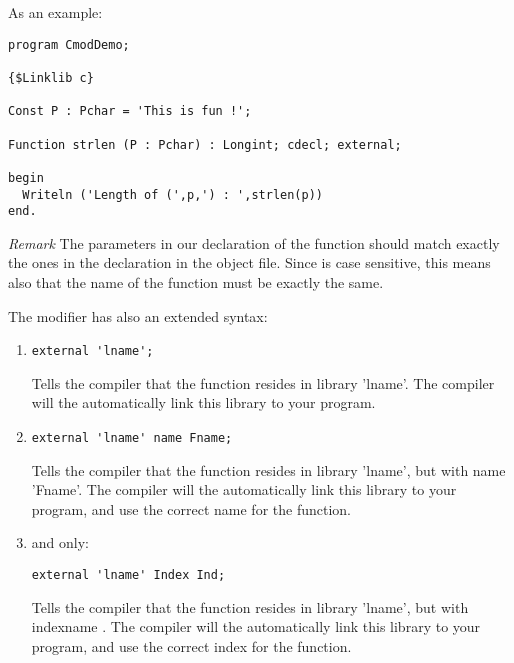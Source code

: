 \documentclass{report}
\begin{document}
As an example:
\begin{CodEx}
\begin{verbatim}
program CmodDemo;

{$Linklib c}

Const P : Pchar = 'This is fun !';

Function strlen (P : Pchar) : Longint; cdecl; external;

begin
  Writeln ('Length of (',p,') : ',strlen(p))
end.
\end{verbatim}
\end{CodEx}

{\em Remark} The parameters in our declaration of the  function 
should match exactly the ones in the declaration in the object file.
Since  is case sensitive, this means also that the name of the
function must be exactly the same.

The  modifier has also an extended syntax:
\begin{enumerate}
\item

\begin{verbatim}
external 'lname';
\end{verbatim}
Tells the compiler that the function resides in library 'lname'. The
compiler will the automatically link this library to your program.

\item
\begin{verbatim}
external 'lname' name Fname;
\end{verbatim}
Tells the compiler that the function resides in library 'lname', but with
name 'Fname'. The compiler will the automatically link this library to your 
program, and use the correct name for the function.

\item \windows and \ostwo only:
\begin{verbatim}
external 'lname' Index Ind;
\end{verbatim}
Tells the compiler that the function resides in library 'lname', but with
indexname . The compiler will the automatically link this library to your 
program, and use the correct index for the function.
\end{enumerate}
\end{document}
